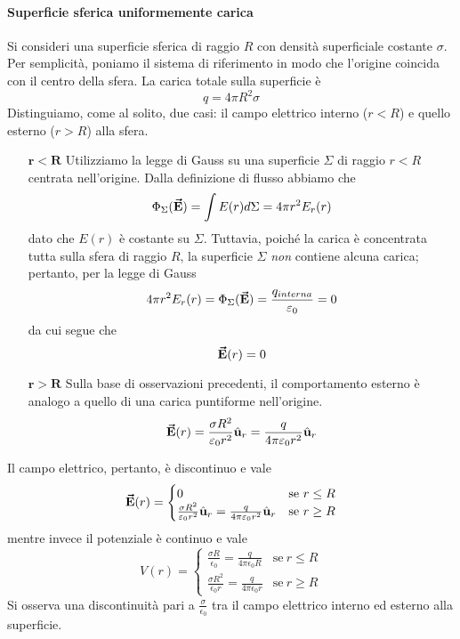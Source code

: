 \paragraph{Superficie sferica uniformemente carica}
Si consideri una superficie sferica di raggio $R$ con densità superficiale costante $\sigma$. Per semplicità, poniamo il sistema di riferimento in modo che l'origine coincida con il centro della sfera.
La carica totale sulla superficie è
\begin{equation}
	q=4\pi R^2 \sigma
\end{equation}
Distinguiamo, come al solito, due casi: il campo elettrico interno ($r<R$) e quello esterno ($r>R$) alla sfera.
\begin{itemize}
	\item[$\mathbf{r<R}$] Utilizziamo la legge di Gauss su una superficie $\Sigma$ di raggio $r<R$ centrata nell'origine. Dalla definizione di flusso abbiamo che
	\begin{equation*}
		\Phi_{\Sigma}(\vb*{\va{E}})=\int E(r)d\Sigma=4\pi r^2 E_r(r)
	\end{equation*}
dato che $E(r)$ è costante su $\Sigma$.
Tuttavia, poiché la carica è concentrata tutta sulla sfera di raggio $R$, la superficie $\Sigma$ \textit{non} contiene alcuna carica; pertanto, per la legge di Gauss
\begin{equation*}
	4\pi r^2 E_r(r)=\Phi_{\Sigma}(\vb*{\va{E}})=\frac{q_{interna}}{\varepsilon_0}=0
\end{equation*}
da cui segue che
\begin{equation}
	\vb*{\va{E}}(r)=0
\end{equation}
\item[$\mathbf{r>R}$] Sulla base di osservazioni precedenti, il comportamento esterno è analogo a quello di una carica puntiforme nell'origine.
\begin{equation}
	\vb*{\va{E}}(r)=\frac{\sigma R^2}{\varepsilon_0r^2}\hat{\mathbf{u}}_r=\frac{q}{4\pi\varepsilon_0r^2}\hat{\mathbf{u}}_r
\end{equation}
\end{itemize}
Il campo elettrico, pertanto, è discontinuo e vale
\begin{equation}
	\vb*{\va{E}}(r)=\begin{cases}
		0&\text{se}\ r\leq R\\
		\frac{\sigma R^2}{\varepsilon_0r^2}\hat{\mathbf{u}}_r=\frac{q}{4\pi\varepsilon_0r^2}\hat{\mathbf{u}}_r &\text{se}\ r\geq R
	\end{cases}
\end{equation}
mentre invece il potenziale è continuo e vale
\begin{equation}
	V(r)=
	\begin{cases}
	\frac{\sigma R}{\epsilon_0}=\frac{q}{4\pi\epsilon_0 R}&\text{se}\ r\leq R\\
	\frac{\sigma R^2}{\epsilon_0 r}=\frac{q}{4\pi\epsilon_0 r}&\text{se}\ r\geq R
	\end{cases}
\end{equation}
Si osserva una discontinuità pari a $\frac{\sigma}{\epsilon_0}$ tra il campo elettrico interno ed esterno alla superficie.
